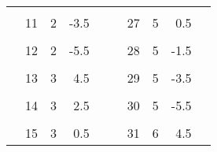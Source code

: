 \begin{tabularx}{\textwidth}{| X r r r X | X r r r X |}
&&&&&&&&& \\[-1.1em] &          11 &     2 & -3.5 & & &          27 &     5 &  0.5 & \\[.2em] \hline
&&&&&&&&& \\[-1.1em] &          12 &     2 & -5.5 & & &          28 &     5 & -1.5 & \\[.2em] \hline
&&&&&&&&& \\[-1.1em] &          13 &     3 &  4.5 & & &          29 &     5 & -3.5 & \\[.2em] \hline
&&&&&&&&& \\[-1.1em] &          14 &     3 &  2.5 & & &          30 &     5 & -5.5 & \\[.2em] \hline
&&&&&&&&& \\[-1.1em] &          15 &     3 &  0.5 & & &          31 &     6 &  4.5 & \\[.2em] \hline
\end{tabularx}


